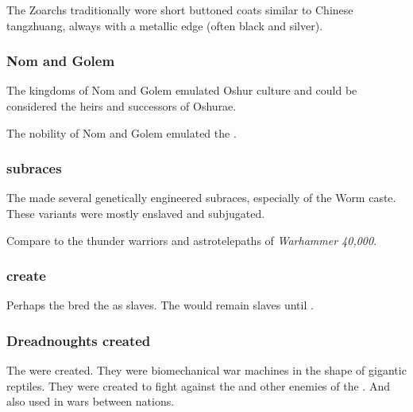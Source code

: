 The Zoarchs traditionally wore short buttoned coats similar to Chinese tangzhuang, always with a metallic edge (often black and silver). 




\subsubsection{Nom and Golem}
The kingdoms of Nom and Golem emulated Oshur culture and could be considered the heirs and successors of Oshurae. 

The nobility of Nom and Golem emulated the . 







\subsubsection{\Ophidian subraces}
The \caisith made several genetically engineered subraces, especially of the Worm caste.
These \caisith variants were mostly enslaved and subjugated. 

Compare to the thunder warriors and astrotelepaths of \emph{Warhammer 40,000}. 





\subsubsection{\Ophidians create \nephilim}
Perhaps the \ophidians bred the \nephilim as slaves.
The \nephilim would remain slaves until . 





\subsubsection{Dreadnoughts created}
The  were created. 
They were biomechanical war machines in the shape of gigantic reptiles. 
They were created to fight against the \vorcanths and other enemies of the \ophidians.
And also used in wars between \ophidian nations. 















